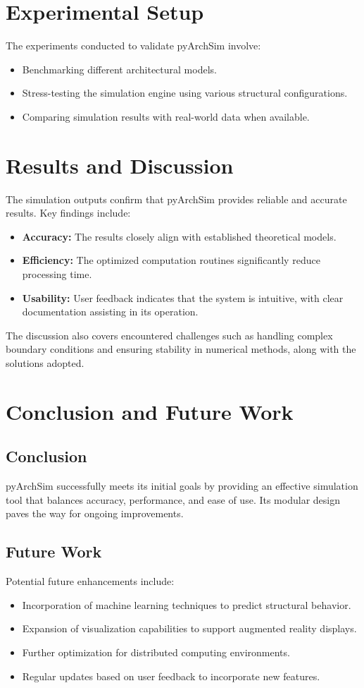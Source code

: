 \documentclass[12pt,a4paper]{report}
\begin{document}
\section{Experimental Setup}
The experiments conducted to validate pyArchSim involve:
\begin{itemize}
  \item Benchmarking different architectural models.
  \item Stress-testing the simulation engine using various structural configurations.
  \item Comparing simulation results with real-world data when available.
\end{itemize}

\section{Results and Discussion}
The simulation outputs confirm that pyArchSim provides reliable and accurate results. Key findings include:
\begin{itemize}
  \item \textbf{Accuracy:} The results closely align with established theoretical models.
  \item \textbf{Efficiency:} The optimized computation routines significantly reduce processing time.
  \item \textbf{Usability:} User feedback indicates that the system is intuitive, with clear documentation assisting in its operation.
\end{itemize}

The discussion also covers encountered challenges such as handling complex boundary conditions and ensuring stability in numerical methods, along with the solutions adopted.

\section{Conclusion and Future Work}
\subsection{Conclusion}
pyArchSim successfully meets its initial goals by providing an effective simulation tool that balances accuracy, performance, and ease of use. Its modular design paves the way for ongoing improvements.

\subsection{Future Work}
Potential future enhancements include:
\begin{itemize}
  \item Incorporation of machine learning techniques to predict structural behavior.
  \item Expansion of visualization capabilities to support augmented reality displays.
  \item Further optimization for distributed computing environments.
  \item Regular updates based on user feedback to incorporate new features.
\end{itemize}
\end{document}
